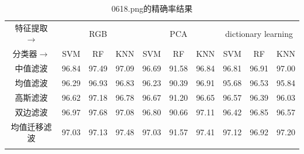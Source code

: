 \documentclass[12pt,hyperref,a4paper,UTF8]{ctexart}
\begin{document}
{%
\begin{table}[!h]
	\centering
	\caption{0618.png的精确率结果}
	\label{tab:precision0618}
	\begin{tabular}{@{}clllllllll@{}}
		\hline
		特征提取$\rightarrow$    & \multicolumn{3}{c}{RGB}                                                    & \multicolumn{3}{c}{PCA}                                                    & \multicolumn{3}{c}{dictionary learning}                                    \\
		分类器$\rightarrow$     & \multicolumn{1}{c}{SVM} & \multicolumn{1}{c}{RF} & \multicolumn{1}{c}{KNN} & \multicolumn{1}{c}{SVM} & \multicolumn{1}{c}{RF} & \multicolumn{1}{c}{KNN} & \multicolumn{1}{c}{SVM} & \multicolumn{1}{c}{RF} & \multicolumn{1}{c}{KNN} \\
		\hline
		中值滤波                 & 96.84                   & 97.49                  & 97.09                   & 96.69                   & 91.58                  & 96.84                   & 96.81                   & 96.91                  & 97.00                   \\
		均值滤波                 & 96.29                   & 96.93                  & 96.83                   & 96.23                   & 90.39                  & 96.91                   & 95.68                   & 96.53                  & 95.84                   \\
		高斯滤波                 & 96.62                   & 97.18                  & 96.78                   & 96.67                   & 91.20                  & 96.65                   & 96.57                   & 96.39                  & 96.03                   \\
		双边滤波                 & 96.97                   & 97.68                  & 97.08                   & 96.80                   & 90.66                  & 97.11                   & 96.42                   & 96.85                  & 96.57                   \\
		均值迁移滤波               & 97.03                   & 97.13                  & 97.48                   & 97.03                   & 91.57                  & 97.41                   & 97.12                   & 96.92                  & 97.20                   \\
		\hline
		\multicolumn{1}{l}{} &                         &                        &                         &                         &                        &                         &                         &                        &                         \\

\end{tabular}
\end{table}}
\end{document}
